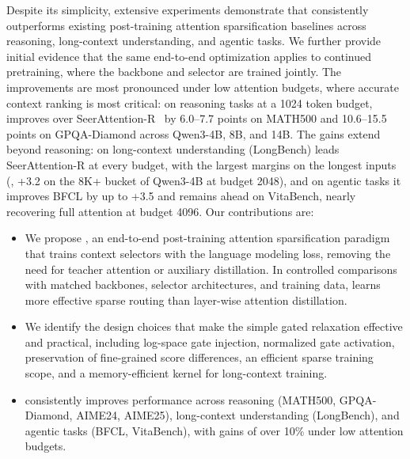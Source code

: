 Despite its simplicity, extensive experiments demonstrate that \our consistently outperforms existing post-training attention sparsification baselines across reasoning, long-context understanding, and agentic tasks. We further provide initial evidence that the same end-to-end optimization applies to continued pretraining, where the backbone and selector are trained jointly.
The improvements are most pronounced under low attention budgets, where accurate context ranking is most critical: on reasoning tasks at a 1024 token budget, \our improves over SeerAttention-R~\citep{gao2025seerattention} by 6.0--7.7 points on MATH500 and 10.6--15.5 points on GPQA-Diamond across Qwen3-4B, 8B, and 14B. The gains extend beyond reasoning: on long-context understanding (LongBench) \our leads SeerAttention-R at every budget, with the largest margins on the longest inputs (\eg, +3.2 on the 8K+ bucket of Qwen3-4B at budget 2048), and on agentic tasks it improves BFCL by up to +3.5 and remains ahead on VitaBench, nearly recovering full attention at budget 4096.
Our contributions are:
{\setlength{\leftmargini}{1.6em}
\begin{itemize}
\item We propose \our, an end-to-end post-training attention sparsification paradigm that trains context selectors with the language modeling loss, removing the need for teacher attention or auxiliary distillation. In controlled comparisons with matched backbones, selector architectures, and training data, \our learns more effective sparse routing than layer-wise attention distillation.
\item 
We identify the design choices that make the simple gated relaxation effective and practical, including log-space gate injection, normalized gate activation, preservation of fine-grained score differences, an efficient sparse training scope, and a memory-efficient kernel for long-context training.
\item 
\our consistently improves performance across reasoning (MATH500, GPQA-Diamond, AIME24, AIME25), long-context understanding (LongBench), and agentic tasks (BFCL, VitaBench), with gains of over 10\% under low attention budgets.
\end{itemize}
}
